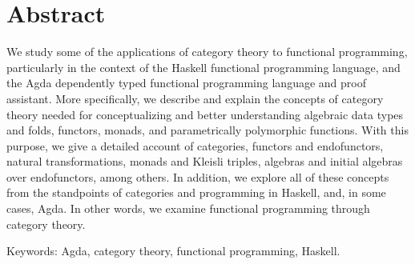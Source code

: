 \chapter{Abstract}
\label{chap:abstract}

We study some of the applications of category theory to functional
programming, particularly in the context of the Haskell functional
programming language, and the Agda dependently typed functional
programming language and proof assistant. More specifically, we
describe and explain the concepts of category theory needed for
conceptualizing and better understanding algebraic data types and
folds, functors, monads, and parametrically polymorphic functions.
With this purpose, we give a detailed account of categories, functors
and endofunctors, natural transformations, monads and Kleisli triples,
algebras and initial algebras over endofunctors, among others. In
addition, we explore all of these concepts from the standpoints of
categories and programming in Haskell, and, in some cases, Agda. In
other words, we examine functional programming through category
theory.

\vspace{1em}
\noindent
Keywords: Agda, category theory, functional programming, Haskell.

\clearemptydoublepage
